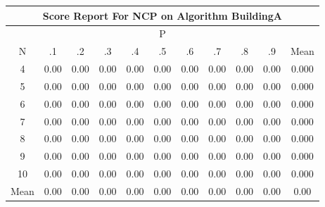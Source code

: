\documentclass[11pt,a4paper]{report}
\begin{document}
\begin{longtable}{ | c || c | c | c | c | c | c | c | c | c || c |}
\hline
\multicolumn{11}{|c|}{ Score Report For NCP on Algorithm BuildingA} \\
\hline
\multicolumn{11}{|c|}{ P } \\
\hline
N & .1 & .2 & .3 & .4 & .5 & .6 & .7 & .8 & .9 & Mean\\
 \hline
 \hline
 \endhead
  4 &  \cellcolor[HTML]{FFFFFF} 0.00 &  \cellcolor[HTML]{FFFFFF} 0.00 &  \cellcolor[HTML]{FFFFFF} 0.00 &  \cellcolor[HTML]{FFFFFF} 0.00 &  \cellcolor[HTML]{FFFFFF} 0.00 &  \cellcolor[HTML]{FFFFFF} 0.00 &  \cellcolor[HTML]{FFFFFF} 0.00 &  \cellcolor[HTML]{FFFFFF} 0.00 &  \cellcolor[HTML]{FFFFFF} 0.00 & 0.000 \\
  5 &  \cellcolor[HTML]{FFFFFF} 0.00 &  \cellcolor[HTML]{FFFFFF} 0.00 &  \cellcolor[HTML]{FFFFFF} 0.00 &  \cellcolor[HTML]{FFFFFF} 0.00 &  \cellcolor[HTML]{FFFFFF} 0.00 &  \cellcolor[HTML]{FFFFFF} 0.00 &  \cellcolor[HTML]{FFFFFF} 0.00 &  \cellcolor[HTML]{FFFFFF} 0.00 &  \cellcolor[HTML]{FFFFFF} 0.00 & 0.000 \\
  6 &  \cellcolor[HTML]{FFFFFF} 0.00 &  \cellcolor[HTML]{FFFFFF} 0.00 &  \cellcolor[HTML]{FFFFFF} 0.00 &  \cellcolor[HTML]{FFFFFF} 0.00 &  \cellcolor[HTML]{FFFFFF} 0.00 &  \cellcolor[HTML]{FFFFFF} 0.00 &  \cellcolor[HTML]{FFFFFF} 0.00 &  \cellcolor[HTML]{FFFFFF} 0.00 &  \cellcolor[HTML]{FFFFFF} 0.00 & 0.000 \\
  7 &  \cellcolor[HTML]{FFFFFF} 0.00 &  \cellcolor[HTML]{FFFFFF} 0.00 &  \cellcolor[HTML]{FFFFFF} 0.00 &  \cellcolor[HTML]{FFFFFF} 0.00 &  \cellcolor[HTML]{FFFFFF} 0.00 &  \cellcolor[HTML]{FFFFFF} 0.00 &  \cellcolor[HTML]{FFFFFF} 0.00 &  \cellcolor[HTML]{FFFFFF} 0.00 &  \cellcolor[HTML]{FFFFFF} 0.00 & 0.000 \\
  8 &  \cellcolor[HTML]{FFFFFF} 0.00 &  \cellcolor[HTML]{FFFFFF} 0.00 &  \cellcolor[HTML]{FFFFFF} 0.00 &  \cellcolor[HTML]{FFFFFF} 0.00 &  \cellcolor[HTML]{FFFFFF} 0.00 &  \cellcolor[HTML]{FFFFFF} 0.00 &  \cellcolor[HTML]{FFFFFF} 0.00 &  \cellcolor[HTML]{FFFFFF} 0.00 &  \cellcolor[HTML]{FFFFFF} 0.00 & 0.000 \\
  9 &  \cellcolor[HTML]{FFFFFF} 0.00 &  \cellcolor[HTML]{FFFFFF} 0.00 &  \cellcolor[HTML]{FFFFFF} 0.00 &  \cellcolor[HTML]{FFFFFF} 0.00 &  \cellcolor[HTML]{FFFFFF} 0.00 &  \cellcolor[HTML]{FFFFFF} 0.00 &  \cellcolor[HTML]{FFFFFF} 0.00 &  \cellcolor[HTML]{FFFFFF} 0.00 &  \cellcolor[HTML]{FFFFFF} 0.00 & 0.000 \\
  10 &  \cellcolor[HTML]{FFFFFF} 0.00 &  \cellcolor[HTML]{FFFFFF} 0.00 &  \cellcolor[HTML]{FFFFFF} 0.00 &  \cellcolor[HTML]{FFFFFF} 0.00 &  \cellcolor[HTML]{FFFFFF} 0.00 &  \cellcolor[HTML]{FFFFFF} 0.00 &  \cellcolor[HTML]{FFFFFF} 0.00 &  \cellcolor[HTML]{FFFFFF} 0.00 &  \cellcolor[HTML]{FFFFFF} 0.00 & 0.000 \\
 \hline
 \hline
Mean &  \cellcolor[HTML]{FFFFFF} 0.00 &  \cellcolor[HTML]{FFFFFF} 0.00 &  \cellcolor[HTML]{FFFFFF} 0.00 &  \cellcolor[HTML]{FFFFFF} 0.00 &  \cellcolor[HTML]{FFFFFF} 0.00 &  \cellcolor[HTML]{FFFFFF} 0.00 &  \cellcolor[HTML]{FFFFFF} 0.00 &  \cellcolor[HTML]{FFFFFF} 0.00 &  \cellcolor[HTML]{FFFFFF} 0.00 &  \cellcolor[HTML]{FFFFFF} 0.00
\end{longtable}
\end{document}
